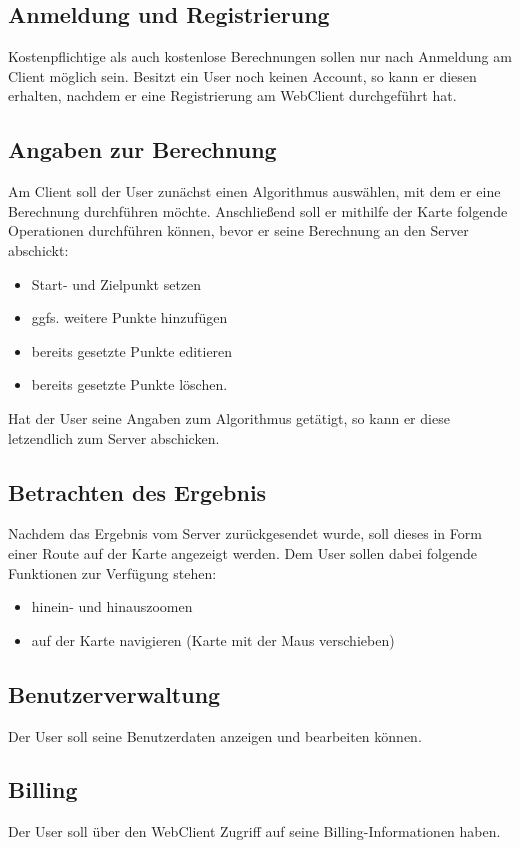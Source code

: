 \documentclass[a4paper,10pt,titlepage]{article}
\begin{document}
\subsection{Anmeldung und Registrierung}
Kostenpflichtige als auch kostenlose Berechnungen sollen nur nach Anmeldung am Client möglich sein.
Besitzt ein User noch keinen Account, so kann er diesen erhalten, nachdem er eine Registrierung am WebClient durchgeführt hat.

\subsection{Angaben zur Berechnung}
Am Client soll der User zunächst einen Algorithmus auswählen, mit dem er eine Berechnung durchführen möchte.
Anschließend soll er mithilfe der Karte folgende Operationen durchführen können, 
bevor er seine Berechnung an den Server abschickt:
\begin{itemize}
 \item Start- und Zielpunkt setzen
 \item ggfs. weitere Punkte hinzufügen
 \item bereits gesetzte Punkte editieren
 \item bereits gesetzte Punkte löschen.
\end{itemize}
Hat der User seine Angaben zum Algorithmus getätigt, so kann er diese letzendlich zum Server abschicken.

\subsection{Betrachten des Ergebnis}
Nachdem das Ergebnis vom Server zurückgesendet wurde, soll dieses in Form einer Route auf der Karte angezeigt werden.
Dem User sollen dabei folgende Funktionen zur Verfügung stehen:
\begin{itemize}
 \item hinein- und hinauszoomen
 \item auf der Karte navigieren (Karte mit der Maus verschieben)
\end{itemize}

\subsection{Benutzerverwaltung}
Der User soll seine Benutzerdaten anzeigen und bearbeiten können.

\subsection{Billing}
Der User soll über den WebClient Zugriff auf seine Billing-Informationen haben.
\end{document}
